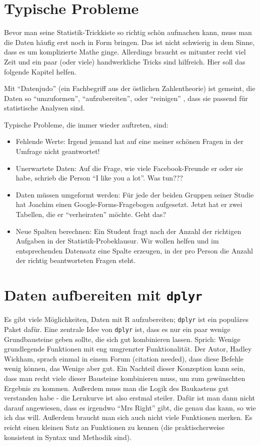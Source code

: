 \documentclass[12pt,]{book}
\providecommand{\tightlist}{%
  \setlength{\itemsep}{0pt}\setlength{\parskip}{0pt}}
\begin{document}
\section{Typische Probleme}\label{typische-probleme}

Bevor man seine Statistik-Trickkiste so richtig schön aufmachen kann,
muss man die Daten häufig erst noch in Form bringen. Das ist nicht
schwierig in dem Sinne, dass es um komplizierte Mathe ginge. Allerdings
braucht es mitunter recht viel Zeit und ein paar (oder viele)
handwerkliche Tricks sind hilfreich. Hier soll das folgende Kapitel
helfen.

Mit ``Datenjudo'' (ein Fachbegriff aus der östlichen Zahlentheorie) ist
gemeint, die Daten so ``umzuformen'', ``aufzubereiten'', oder
``reinigen'' , dass sie passend für statistische Analysen sind.

Typische Probleme, die immer wieder auftreten, sind:

\begin{itemize}
\tightlist
\item
  Fehlende Werte: Irgend jemand hat auf eine meiner schönen Fragen in
  der Umfrage nicht geantwortet!
\item
  Unerwartete Daten: Auf die Frage, wie viele Facebook-Freunde er oder
  sie habe, schrieb die Person ``I like you a lot''. Was tun???
\item
  Daten müssen umgeformt werden: Für jede der beiden Gruppen seiner
  Studie hat Joachim einen Google-Forms-Fragebogen aufgesetzt. Jetzt hat
  er zwei Tabellen, die er ``verheiraten'' möchte. Geht das?
\item
  Neue Spalten berechnen: Ein Student fragt nach der Anzahl der
  richtigen Aufgaben in der Statistik-Probeklausur. Wir wollen helfen
  und im entsprechenden Datensatz eine Spalte erzeugen, in der pro
  Person die Anzahl der richtig beantworteten Fragen steht.
\end{itemize}

\section{\texorpdfstring{Daten aufbereiten mit
\texttt{dplyr}}{Daten aufbereiten mit dplyr}}\label{daten-aufbereiten-mit-dplyr}

Es gibt viele Möglichkeiten, Daten mit R aufzubereiten; \texttt{dplyr}
ist ein populäres Paket dafür. Eine zentrale Idee von \texttt{dplyr}
ist, dass es nur ein paar wenige Grundbausteine geben sollte, die sich
gut kombinieren lassen. Sprich: Wenige grundlegende Funktionen mit eng
umgrenzter Funktionalität. Der Autor, Hadley Wickham, sprach einmal in
einem Forum (citation needed), dass diese Befehle wenig können, das
Wenige aber gut. Ein Nachteil dieser Konzeption kann sein, dass man
recht viele dieser Bausteine kombinieren muss, um zum gewünschten
Ergebnis zu kommen. Außerdem muss man die Logik des Baukastens gut
verstanden habe - die Lernkurve ist also erstmal steiler. Dafür ist man
dann nicht darauf angewiesen, dass es irgendwo ``Mrs Right'' gibt, die
genau das kann, so wie ich das will. Außerdem braucht man sich auch
nicht viele Funktionen merken. Es reicht einen kleinen Satz an
Funktionen zu kennen (die praktischerweise konsistent in Syntax und
Methodik sind).
\end{document}
